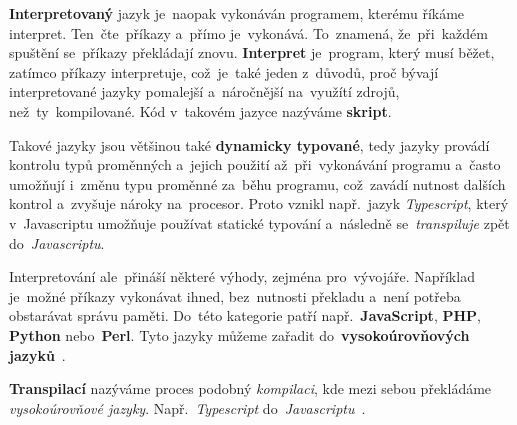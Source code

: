\documentclass[11pt,a4paper]{report}
\begin{document}
            \textbf{Interpretovaný} jazyk je~naopak vykonáván programem, kterému říkáme interpret. Ten~čte~příkazy a~přímo je~vykonává. To~znamená, že~při~každém spuštění se~příkazy překládají znovu. \textbf{Interpret} je~program, který musí běžet, zatímco příkazy interpretuje, což~je~také jeden z~důvodů, proč bývají interpretované jazyky pomalejší a~náročnější na~využítí zdrojů, než~ty~kompilované. Kód v~takovém jazyce nazýváme \textbf{skript}.

            Takové jazyky jsou většinou také \textbf{dynamicky typované}, tedy jazyky provádí kontrolu typů proměnných a~jejich použití až~při~vykonávání programu a~často umožňují i~změnu typu proměnné za~běhu programu, což~zavádí nutnost dalších kontrol a~zvyšuje nároky na~procesor. Proto vznikl např.~jazyk \emph{Typescript}, který v~Javascriptu umožňuje používat statické typování a~následně se~\emph{transpiluje} zpět do~\emph{Javascriptu}.
            
            Interpretování ale~přináší některé výhody, zejména pro~vývojáře. Například je~možné příkazy vykonávat ihned, bez~nutnosti překladu a~není potřeba obstarávat správu paměti. Do~této kategorie patří např.~\textbf{JavaScript}, \textbf{PHP}, \textbf{Python} nebo~\textbf{Perl}. Tyto jazyky můžeme zařadit do~\textbf{vysokoúrovňových jazyků}~\cite{ueda:compiled}.

            \textbf{Transpilací} nazýváme proces podobný \emph{kompilaci}, kde mezi sebou překládáme \emph{vysokoúrovňové jazyky}. Např.~\emph{Typescript} do~\emph{Javascriptu}~\cite{fuertes:Transpilers}.
        
\end{document}
